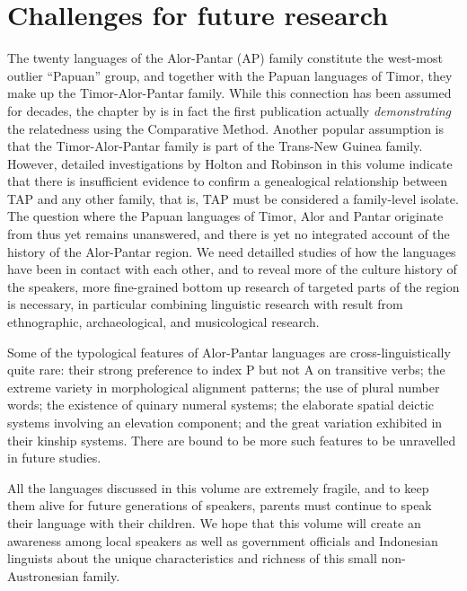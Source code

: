 \section{Challenges for future research}\label{sec:1:7}

The twenty languages of the Alor-Pantar (AP) family constitute the west-most outlier ``Papuan'' group, and together with the Papuan languages of Timor, they make up the Timor-Alor-Pantar family. While this connection has been assumed for decades, the chapter by \citet{SchapperEtAlTVtimor} is in fact the first publication actually \textit{demonstrating} the relatedness using the Comparative Method. Another popular assumption is that the Timor-Alor-Pantar family is part of the Trans-New Guinea family. However, detailed investigations by Holton and Robinson in this volume indicate that there is insufficient evidence to confirm a genealogical relationship between TAP and any other family, that is, TAP must be considered a family-level isolate. The question where the Papuan languages of Timor, Alor and Pantar originate from thus yet remains unanswered, and there is yet no integrated account of the history of the Alor-Pantar region. We need detailled studies of how the languages have been in contact with each other, and to reveal more of the culture history of the speakers, more fine-grained bottom up research of targeted parts of the region is necessary, in particular combining linguistic research with result from ethnographic, archaeological, and musicological research. 

Some of the typological features of Alor-Pantar languages are cross-linguistically quite rare: their strong preference to index P but not A on transitive verbs; the extreme variety in morphological alignment patterns; the use of plural number words; the existence of quinary numeral systems; the elaborate spatial deictic systems involving an elevation component; and the great variation exhibited in their kinship systems. There are bound to be more such features to be unravelled in future studies.

All the languages discussed in this volume are extremely fragile, and to keep them alive for future generations of speakers, parents must continue to speak their language with their children. We hope that this volume will create an awareness among local speakers as well as government officials and Indonesian linguists about the unique characteristics and richness of this small non-Austronesian family.

